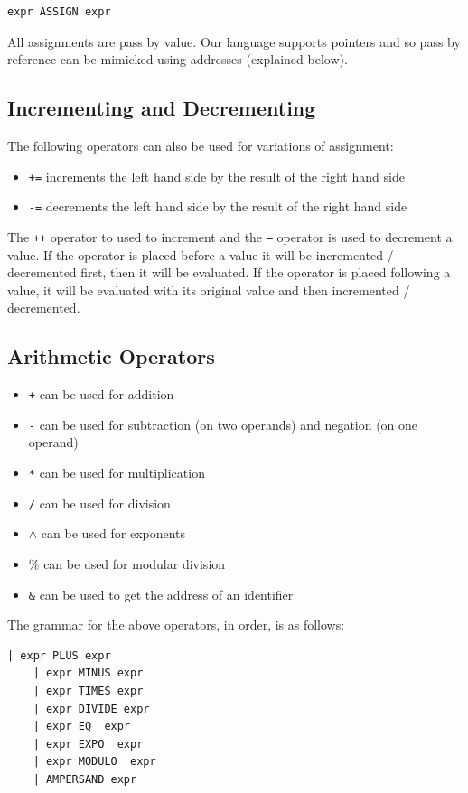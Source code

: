 \documentclass{article}
\begin{document}
\begin{Verbatim}[frame=single]
 expr ASSIGN expr 
\end{Verbatim}

All assignments are pass by value. Our language supports pointers and so pass by reference can be mimicked using addresses (explained below).

\subsection{Incrementing and Decrementing}
The following operators can also be used for variations of assignment:

\begin{itemize}
\item \texttt{+=} increments the left hand side by the result of the right hand side
\item \texttt{-=} decrements the left hand side by the result of the right hand side
\end{itemize}

 The \texttt{++} operator to used to increment and the \texttt{--} operator is used to decrement a value.  If the operator is placed before a value it will be incremented / decremented first, then it will be evaluated.  If the operator is placed following a value, it will be evaluated with its original value and then incremented / decremented.

\subsection{Arithmetic Operators}
\begin{itemize}
\item \texttt{+} can be used for addition
\item \texttt{-} can be used for subtraction (on two operands) and negation (on one operand)
\item \texttt{*} can be used for multiplication
\item \texttt{/} can be used for division
\item \texttt{$\wedge$} can be used for exponents
\item \texttt{$\%$} can be used for modular division
\item \texttt{\&} can be used to get the address of an identifier
\end{itemize}



The grammar for the above operators, in order, is as follows:
\begin{Verbatim}[frame=single]
	| expr PLUS expr 	
	| expr MINUS expr 	
	| expr TIMES expr 
	| expr DIVIDE expr 
	| expr EQ  expr 
	| expr EXPO  expr 
	| expr MODULO  expr 
	| AMPERSAND expr
\end{Verbatim}
\end{document}
